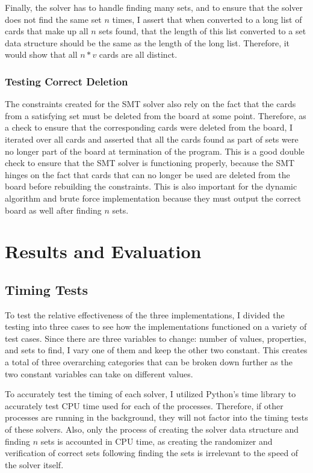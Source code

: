 \documentclass[pageno]{jpaper}
\begin{document}
Finally, the solver has to handle finding many sets, and to ensure that the solver does not find the same set $n$ times, I assert that when converted to a long list of cards that make up all $n$ sets found, that the length of this list converted to a set data structure should be the same as the length of the long list. Therefore, it would show that all $n*v$ cards are all distinct. 

\subsubsection{Testing Correct Deletion}

The constraints created for the SMT solver also rely on the fact that the cards from a satisfying set must be deleted from the board at some point. Therefore, as a check to ensure that the corresponding cards were deleted from the board, I iterated over all cards and asserted that all the cards found as part of sets were no longer part of the board at termination of the program. This is a good double check to ensure that the SMT solver is functioning properly, because the SMT hinges on the fact that cards that can no longer be used are deleted from the board before rebuilding the constraints. This is also important for the dynamic algorithm and brute force implementation because they must output the correct board as well after finding $n$ sets.

\section{Results and Evaluation}

\subsection{Timing Tests}

To test the relative effectiveness of the three implementations, I divided the testing into three cases to see how the implementations functioned on a variety of test cases. Since there are three variables to change: number of values, properties, and sets to find, I vary one of them and keep the other two constant. This creates a total of three overarching categories that can be broken down further as the two constant variables can take on different values. 

To accurately test the timing of each solver, I utilized Python's time library to accurately test CPU time used for each of the processes. Therefore, if other processes are running in the background, they will not factor into the timing tests of these solvers. Also, only the process of creating the solver data structure and finding $n$ sets is accounted in CPU time, as creating the randomizer and verification of correct sets following finding the sets is irrelevant to the speed of the solver itself. 
\end{document}
